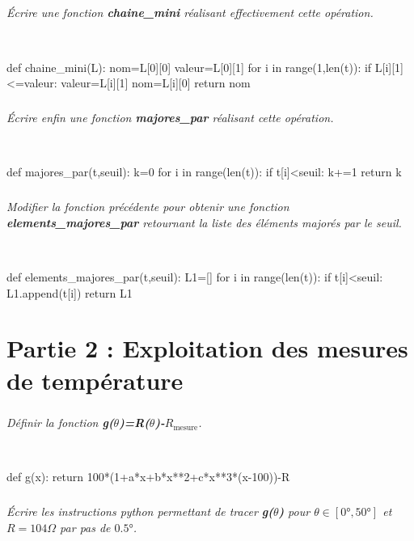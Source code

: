 \documentclass[10pt,fleqn]{article} %
\begin{document}
\subparagraph{}
\textit{Écrire une fonction \textbf{chaine\_mini} réalisant effectivement cette opération.}


\ifprof
\begin{corrige}~\
\begin{python}
def chaine_mini(L):
    nom=L[0][0]
    valeur=L[0][1]
    for i in range(1,len(t)):
        if L[i][1]<=valeur:
            valeur=L[i][1]
            nom=L[i][0]
    return nom
\end{python}
\end{corrige}
\else
\fi

\subparagraph{} 
\textit{Écrire enfin une fonction \textbf{majores\_par} réalisant cette opération.}

\ifprof
\begin{corrige}~\
\begin{python}
def majores_par(t,seuil):
    k=0
    for i in range(len(t)):
        if t[i]<seuil:
            k+=1
    return k
\end{python}
\end{corrige}
\else
\fi

\subparagraph{}
\textit{Modifier la fonction précédente pour obtenir une fonction \textbf{elements\_majores\_par}
  retournant la liste des éléments majorés par le seuil.}
	
\ifprof
\begin{corrige}~\
\begin{python}
def elements_majores_par(t,seuil):
    L1=[]
    for i in range(len(t)):
        if t[i]<seuil:
            L1.append(t[i])
    return L1
\end{python}
\end{corrige}
\else
\fi

\section*{Partie 2 : Exploitation des mesures de température}


\subparagraph{}
\textit{Définir la fonction \textbf{g($\theta$)=R($\theta$)-$R_{\text{mesure}}$}.}

\ifprof
\begin{corrige}~\
\begin{python}
def g(x):
    return 100*(1+a*x+b*x**2+c*x**3*(x-100))-R
\end{python}
\end{corrige}
\else
\fi

\subparagraph{}
\textit{Écrire les instructions python permettant de tracer \textbf{g($\theta$)} pour $\theta\in[0°,50°]$ et $R=104\Omega$ par pas de $0.5°$.}
\end{document}
